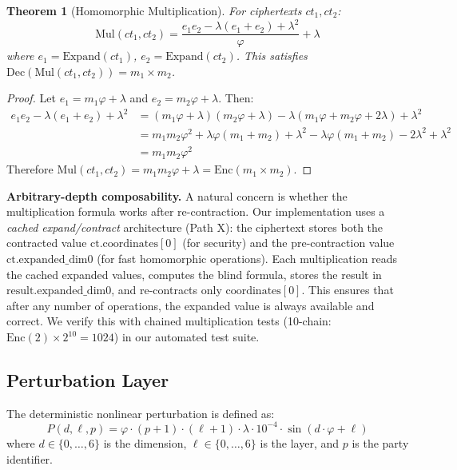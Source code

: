 \documentclass[11pt,a4paper]{article}
\newtheorem{theorem}{Theorem}[section]
\begin{document}
\begin{theorem}[Homomorphic Multiplication]
For ciphertexts $ct_1, ct_2$:
\begin{equation}
    \text{Mul}(ct_1, ct_2) = \frac{e_1 e_2 - \lambda(e_1 + e_2) + \lambda^2}{\varphi} + \lambda
\end{equation}
where $e_1 = \text{Expand}(ct_1)$, $e_2 = \text{Expand}(ct_2)$. This satisfies $\text{Dec}(\text{Mul}(ct_1, ct_2)) = m_1 \times m_2$.
\end{theorem}

\begin{proof}
Let $e_1 = m_1 \varphi + \lambda$ and $e_2 = m_2 \varphi + \lambda$. Then:
\begin{align}
    e_1 e_2 - \lambda(e_1 + e_2) + \lambda^2 &= (m_1 \varphi + \lambda)(m_2 \varphi + \lambda) - \lambda(m_1 \varphi + m_2 \varphi + 2\lambda) + \lambda^2 \\
    &= m_1 m_2 \varphi^2 + \lambda\varphi(m_1 + m_2) + \lambda^2 - \lambda\varphi(m_1 + m_2) - 2\lambda^2 + \lambda^2 \\
    &= m_1 m_2 \varphi^2
\end{align}
Therefore $\text{Mul}(ct_1, ct_2) = m_1 m_2 \varphi + \lambda = \text{Enc}(m_1 \times m_2)$.
\end{proof}

\textbf{Arbitrary-depth composability.} A natural concern is whether the multiplication formula works after re-contraction. Our implementation uses a \textit{cached expand/contract} architecture (Path X): the ciphertext stores both the contracted value $\text{ct.coordinates}[0]$ (for security) and the pre-contraction value $\text{ct.expanded\_dim0}$ (for fast homomorphic operations). Each multiplication reads the cached expanded values, computes the blind formula, stores the result in $\text{result.expanded\_dim0}$, and re-contracts only $\text{coordinates}[0]$. This ensures that after any number of operations, the expanded value is always available and correct. We verify this with chained multiplication tests (10-chain: $\text{Enc}(2) \times 2^{10} = 1024$) in our automated test suite.

\subsection{Perturbation Layer}
\label{sec:perturbation}

The deterministic nonlinear perturbation is defined as:
\begin{equation}
    P(d, \ell, p) = \varphi \cdot (p+1) \cdot (\ell+1) \cdot \lambda \cdot 10^{-4} \cdot \sin(d \cdot \varphi + \ell)
\end{equation}
where $d \in \{0,\ldots,6\}$ is the dimension, $\ell \in \{0,\ldots,6\}$ is the layer, and $p$ is the party identifier.
\end{document}
